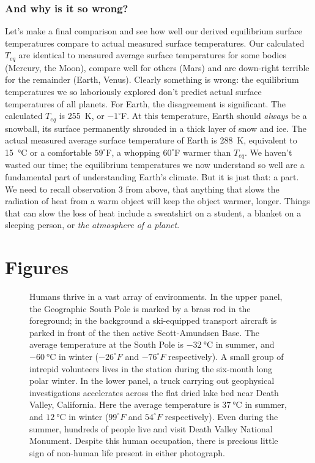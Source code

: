\subsubsection{And why is it so wrong?}
Let's make a final comparison and see how well our derived equilibrium surface temperatures compare to actual measured surface temperatures. Our calculated $T_{eq}$ are identical to measured average surface temperatures for some bodies (Mercury, the Moon), compare well for others (Mars) and are down-right terrible for the remainder (Earth, Venus). Clearly something is wrong: the equilibrium temperatures we so laboriously explored don't predict actual surface temperatures of all planets. For Earth, the disagreement is significant. The calculated $T_{eq}$ is \SI{255}{\kelvin}, or $-1^{\circ}$F. At this temperature, Earth should \emph{always} be a snowball, its surface permanently shrouded in a thick layer of snow and ice. The actual measured average surface temperature of Earth is \SI{288}{\kelvin}, equivalent to \SI{15}{\degreeCelsius} or a comfortable $59^{\circ}$F, a whopping $60^{\circ}$F warmer than $T_{eq}$. We haven't wasted our time; the equilibrium temperatures we now understand so well are a fundamental part of understanding Earth's climate. But it is just that: a part. We need to recall observation 3 from above, that anything that slows the radiation of heat from a warm object will keep the object warmer, longer. Things that can slow the loss of heat include a sweatshirt on a student, a blanket on a sleeping person, or \emph{the atmosphere of a planet}. 


\section{Figures} \label{EHTL_Figures}

\begin{figure}[p]
\centering
{}


\caption{Humans thrive in a vast array of environments. In the upper panel, the Geographic South Pole is marked by a brass rod in the foreground; in the background a ski-equipped transport aircraft is parked in front of the then active Scott-Amundsen Base. The average temperature at the South Pole is $\SI{-32}{\degreeCelsius}$ in summer, and $\SI{-60}{\degreeCelsius}$ in winter ($-26^{\circ} F$ and $-76^{\circ} F$ respectively). A small group of intrepid volunteers lives in the station during the six-month long polar winter. In the lower panel, a truck carrying out geophysical investigations accelerates across the flat dried lake bed near Death Valley,  California. Here the average temperature is $\SI{37}{\degreeCelsius}$ in summer, and $\SI{12}{\degreeCelsius}$ in winter ($99^{\circ} F$ and $54^{\circ} F$ respectively). Even during the summer, hundreds of people live and visit Death Valley National Monument. Despite this human occupation, there is precious little sign of non-human life present in either photograph.}
\label{fig:humans_thrive}
\end{figure}

